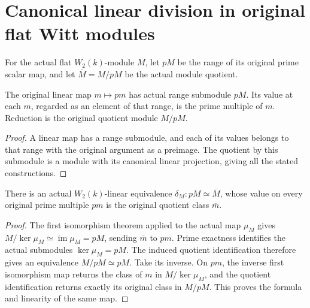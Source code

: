 \section{Canonical linear division in original flat Witt modules}
\label{sec:witt-two-module-division}

For the actual flat $W_2(k)$-module $M$, let $pM$
be the range of its original prime scalar map,
and let $\overline M=M/pM$ be the actual module quotient.

\begin{definition}
\label{def:witt-two-module-prime-image}
\leanok
{}
The original linear map $m\mapsto pm$ has actual
range submodule $pM$. Its value at each $m$,
regarded as an element of that range, is the prime
multiple of $m$. Reduction is the original quotient
module $M/pM$.
\end{definition}
\begin{proof}
A linear map has a range submodule, and each of its
values belongs to that range with the original
argument as a preimage. The quotient by this
submodule is a module with its canonical linear
projection, giving all the stated constructions.
\end{proof}

\begin{theorem}
\label{thm:witt-two-module-linear-division}
\leanok
{}
There is an actual $W_2(k)$-linear equivalence
$\delta_M:pM\simeq\overline M$, whose value
on every original prime multiple $pm$ is the
original quotient class $\overline m$.
\end{theorem}
\begin{proof}
The first isomorphism theorem applied to the actual
map $\mu_M$ gives
$M/\ker\mu_M\simeq\operatorname{im}\mu_M=pM$,
sending $\overline m$ to $pm$. Prime exactness
identifies the actual submodules
$\ker\mu_M=pM$. The induced quotient identification
therefore gives an equivalence $M/pM\simeq pM$.
Take its inverse. On $pm$, the inverse first
isomorphism map returns the class of $m$ in
$M/\ker\mu_M$, and the quotient identification
returns exactly its original class in $M/pM$.
This proves the formula and linearity of the same map.
\end{proof}

